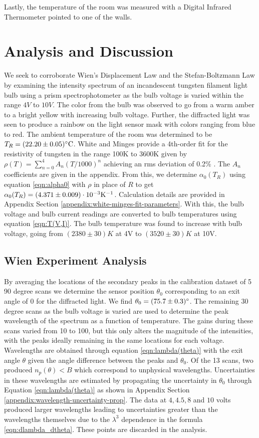 \documentclass[
	a4paper, %
	10pt, %
	twoside, %
]{journal}
\begin{document}
Lastly, the temperature of the room was measured with a Digital Infrared Thermometer pointed to one of the walls.
\section{Analysis and Discussion}
We seek to corroborate Wien's Displacement Law and the Stefan-Boltzmann Law by examining the intensity spectrum of an incandescent tungsten filament light bulb using a prism spectrophotometer as the bulb voltage is varied within the range $4\unit{V}$ to $10\unit{V}$. The color from the bulb was observed to go from a warm amber to a bright yellow with increasing bulb voltage. Further, the diffracted light was seen to produce a rainbow on the light sensor mask with colors ranging from blue to red. The ambient temperature of the room was determined to be $T_R = \roomTemp$. White and Minges provide a 4th-order fit for the resistivity of tungsten in the range 100K to 3600K given by $\rho(T) = \sum_{n = 0}^4A_n(T/1000)^n$ achieving an rms deviation of 0.2\% \autocite{White_Minges_1997}. The $A_n$ coefficients are given in the appendix. From this, we determine $\alpha_0(T_R)$ using equation \ref{eqn:alpha0} with $\rho$ in place of $R$ to get $\alpha_0(T_R) = \alphaNought$. Calculation details are provided in Appendix Section \ref{appendix:white-minges-fit-parameters}.  With this, the bulb voltage and bulb current readings are converted to bulb temperatures using equation \ref{eqn:T(V,I)}. The bulb temperature was found to increase with bulb voltage, going from $(2380 \pm 30)\unit{K}$ at 4V to $(3520 \pm 30)\unit{K}$ at 10V.

\subsection{Wien Experiment Analysis}
By averaging the locations of the secondary peaks in the calibration dataset of 5 90 degree scans we determine the sensor position $\theta_0$ corresponding to an exit angle of 0 for the diffracted light. We find $\theta_{0} = (75.7 \pm 0.3)^\circ$. The remaining 30 degree scans as the bulb voltage is varied are used to determine the peak wavelength of the spectrum as a function of temperature. The gains during these scans varied from 10 to 100, but this only alters the magnitude of the intensities, with the peaks ideally remaining in the same locations for each voltage. Wavelengths are obtained through equation \ref{eqn:lambda(theta)} with the exit angle $\theta$ given the angle difference between the peaks and $\theta_0$. Of the 13 scans, two produced $n_p(\theta) < B$ which correspond to unphysical wavelengths. Uncertainties in these wavelengths are estimated by propagating the uncertainty in $\theta_0$ through Equation \ref{eqn:lambda(theta)} as shown in Appendix Section \ref{appendix:wavelength-uncertainty-prop}. The data at $4, 4.5, 8$ and $10$ volts produced larger wavelengths leading to uncertainties greater than the wavelengths themselves due to the $\lambda^3$ dependence in the formula \ref{eqn:dlambda_dtheta}. These points are discarded in the analysis. 
\end{document}
